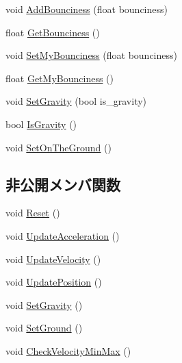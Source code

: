 \begin{DoxyCompactItemize}
\item 
void \mbox{\hyperlink{class_physics_af88191e5605a97952caefd19319b05f9}{Add\+Bounciness}} (float bounciness)
\item 
float \mbox{\hyperlink{class_physics_a5126745b31c45267ae516cc09a82fb5d}{Get\+Bounciness}} ()
\item 
void \mbox{\hyperlink{class_physics_a662185709961c64615c51ac5f32ab2ff}{Set\+My\+Bounciness}} (float bounciness)
\item 
float \mbox{\hyperlink{class_physics_acd6312afafb3faed57ba6450ed9ab9a6}{Get\+My\+Bounciness}} ()
\item 
void \mbox{\hyperlink{class_physics_a6f4c3f73eb1d2669ccc449b0d74f9d32}{Set\+Gravity}} (bool is\+\_\+gravity)
\item 
bool \mbox{\hyperlink{class_physics_a666e85a519fcb5f350a1f42273842f4d}{Is\+Gravity}} ()
\item 
void \mbox{\hyperlink{class_physics_a4e132f82ecc7f24200ec72213e2dc0c6}{Set\+On\+The\+Ground}} ()
\end{DoxyCompactItemize}
\subsection*{非公開メンバ関数}
\begin{DoxyCompactItemize}
\item 
void \mbox{\hyperlink{class_physics_a7ba30ff9f5a0a0a12616ed861f68a20f}{Reset}} ()
\item 
void \mbox{\hyperlink{class_physics_a122041053c2c4e69cdf6dc92076e1d79}{Update\+Acceleration}} ()
\item 
void \mbox{\hyperlink{class_physics_abd74d6413b1fd6c77007edf51ea9db4b}{Update\+Velocity}} ()
\item 
void \mbox{\hyperlink{class_physics_a481f06d777c1b1f52dc2c06c71e93932}{Update\+Position}} ()
\item 
void \mbox{\hyperlink{class_physics_ac52e3e0cccd6268aa592d1e5f098a685}{Set\+Gravity}} ()
\item 
void \mbox{\hyperlink{class_physics_a5bb34919242bdb3472e574b7e024b7e7}{Set\+Ground}} ()
\item 
void \mbox{\hyperlink{class_physics_af6ad00988f0aa878285b930121d4748c}{Check\+Velocity\+Min\+Max}} ()
\end{DoxyCompactItemize}
